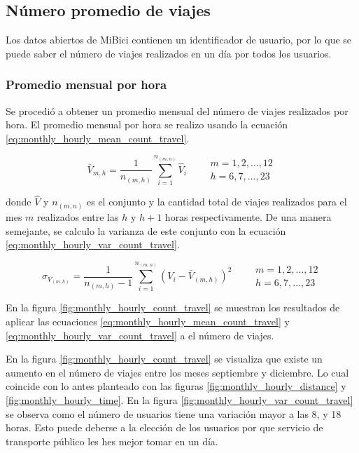\subsection{Número promedio de viajes}

Los datos abiertos de MiBici contienen un identificador de usuario, por lo que se puede saber el número de viajes realizados en un día por todos los usuarios.

\subsubsection{Promedio mensual por hora}

Se procedió a obtener un promedio mensual del número de viajes realizados por hora. El promedio mensual por hora se realizo usando la ecuación \ref{eq:monthly_hourly_mean_count_travel}.

\begin{equation}
    \bar{V}_{m,h} = \frac{1}{n_{(m,h)}} \sum_{i=1}^{n_{(m,n)}} \hat{V}_{i} \qquad \begin{matrix}
        m=1,2,\dots,12 \\ h=6,7,\dots,23
    \end{matrix} \label{eq:monthly_hourly_mean_count_travel}
\end{equation}

donde $\hat{V}$ y $n_{(m,n)}$ es el conjunto y la cantidad total de viajes realizados para el mes $m$ realizados entre las $h$ y $h+1$ horas respectivamente. De una manera semejante, se calculo la varianza de este conjunto con la ecuación \ref{eq:monthly_hourly_var_count_travel}.

\begin{equation}
    \sigma_{V_{(m,h)}} = \frac{1}{n_{(m,h)}-1} \sum_{i=1}^{n_{(m,n)}} (V_i-\bar{V}_{(m,h)})^2 \qquad \begin{matrix}
        m=1,2,\dots,12 \\ h=6,7,\dots,23
    \end{matrix} \label{eq:monthly_hourly_var_count_travel}
\end{equation}

En la figura \ref{fig:monthly_hourly_count_travel} se muestran los resultados de aplicar las ecuaciones \ref{eq:monthly_hourly_mean_count_travel} y \ref{eq:monthly_hourly_var_count_travel} a el número de viajes.

En la figura \ref{fig:monthly_hourly_count_travel} se visualiza que existe un aumento en el número de viajes entre los meses septiembre y diciembre. Lo cual coincide con lo antes planteado con las figuras \ref{fig:monthly_hourly_distance} y \ref{fig:monthly_hourly_time}. En la figura \ref{fig:monthly_hourly_var_count_travel} se observa como el número de usuarios tiene una variación mayor a las 8, y 18 horas. Esto puede deberse a la elección de los usuarios por que servicio de transporte público les hes mejor tomar en un día.

